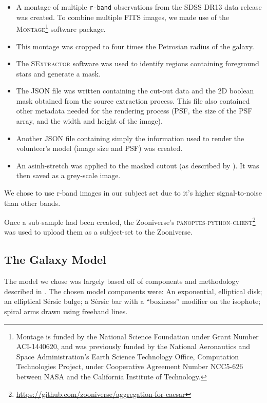 \documentclass[../main.tex]{subfiles}
\begin{document}
\begin{itemize}
\item A montage of multiple \texttt{r-band} observations from the SDSS DR13 data release was created. To combine multiple FITS images, we made use of the \textsc{Montage}\footnote{Montage is funded by the National Science Foundation under Grant Number ACI-1440620, and was previously funded by the National Aeronautics and Space Administration's Earth Science Technology Office, Computation Technologies Project, under Cooperative Agreement Number NCC5-626 between NASA and the California Institute of Technology.} software package.
\item This montage was cropped to four times the Petrosian radius of the galaxy.
\item The \textsc{SExtractor} software \citep{source-extractor} was used to identify regions containing foreground stars and generate a mask.
\item The JSON file was written containing the cut-out data and the 2D boolean mask obtained from the source extraction process. This file also contained other metadata needed for the rendering process (PSF, the size of the PSF array, and the width and height of the image).
\item Another JSON file containing simply the information used to render the volunteer's model (image size and PSF) was created.
\item An asinh-stretch was applied to the masked cutout (as described by \citealt{Lupton2003:astro-ph/0312483v1}). It was then saved as a grey-scale image.
\end{itemize}

We chose to use r-band images in our subject set due to it's higher signal-to-noise than other bands.

Once a sub-sample had been created, the Zooniverse's \textsc{panoptes-python-client}\footnote{\url{https://github.com/zooniverse/aggregation-for-caesar}} \citep{coleman_krawczyk_2019_2562861} was used to upload them as a subject-set to the Zooniverse.


\subsection{The Galaxy Model}
\label{section:galaxy-model}

The model we chose was largely based off of components and methodology described in \citet{galfit-paper}. The chosen model components were: An exponential, elliptical disk; an elliptical S\'ersic bulge; a S\'ersic bar with a ``boxiness'' modifier on the isophote; spiral arms drawn using freehand lines.
\end{document}
